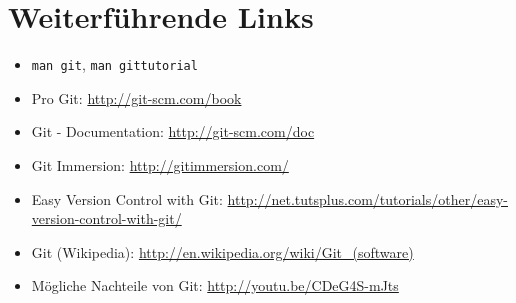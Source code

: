 \section{Weiterführende Links}
\begin{itemize}
  \item \texttt{man git}, \texttt{man gittutorial}
  \item Pro Git: \url{http://git-scm.com/book}
  \item Git - Documentation: \url{http://git-scm.com/doc}
  \item Git Immersion: \url{http://gitimmersion.com/}
  \item Easy Version Control with Git: \url{http://net.tutsplus.com/tutorials/other/easy-version-control-with-git/}
  \item Git (Wikipedia): \url{http://en.wikipedia.org/wiki/Git_(software)}
  \item Mögliche Nachteile von Git: \url{http://youtu.be/CDeG4S-mJts}
\end{itemize}
